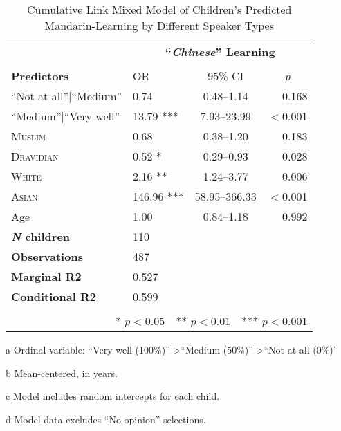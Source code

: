 \begin{table*}[t]
\small
\caption{Cumulative Link Mixed Model of Children's Predicted Mandarin-Learning by Different Speaker Types}\label{tab:mandarin-ord}
    \centering
    \vspace{5pt}
\begin{threeparttable}
\begin{tabular}{llcr}
 \toprule
& \multicolumn{3}{c}{\textbf{``\textit{Chinese}'' Learning}\tnote{a}} \\
\cline{2-4} \\[-.75em]
\textbf{Predictors} & {OR} & {95\% CI} & \multicolumn{1}{c}{\textit{p}} \\ 
\midrule
``Not at all''$|$``Medium'' & 0.74 & 0.48--1.14 & 0.168 \\ 
``Medium''$|$``Very well'' & 13.79 *** & 7.93--23.99 & $<$0.001 \\ 
  \textsc{Muslim} & 0.68 & 0.38--1.20 & 0.183 \\ 
  \textsc{Dravidian} & 0.52 * & 0.29--0.93 & 0.028 \\ 
  \textsc{White} & 2.16 ** & 1.24--3.77 & 0.006 \\ 
  \textsc{Asian} & 146.96 *** & 58.95--366.33 & $<$0.001 \\ 
Age\tnote{b} & 1.00 & 0.84--1.18 & 0.992 \\ 
\midrule
\bfseries{\textit{N} children}\tnote{c} & 110 &  &  \\ 
\textbf{Observations}\tnote{d} & 487 &  &  \\ 
 \textbf{Marginal R2} & 0.527 &  &  \\ 
 \textbf{Conditional R2} & 0.599 &&\\
\bottomrule\\[-.75em]
\multicolumn{4}{r}{* $p<0.05$~~** $p<0.01$~~*** $p<0.001$}\\
\end{tabular}
\begin{tablenotes}[flushleft]
    \item[a] Ordinal variable: ``Very well (100\%)'' \textgreater ``Medium (50\%)'' \textgreater ``Not at all (0\%)'
    \item[b] Mean-centered, in years.
    \item[c] Model includes random intercepts for each child.
    \item[d] Model data excludes ``No opinion'' selections. 
\end{tablenotes}
\end{threeparttable}
\end{table*}